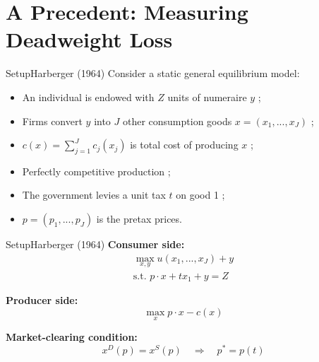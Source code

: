\documentclass{beamer}
\begin{document}
\section{A Precedent: Measuring Deadweight Loss}
\begin{frame}[shrink]
	\transfade %
	\tableofcontents[sectionstyle=show/shaded,subsectionstyle=show/shaded/hide]
	\addtocounter{framenumber}{-1}
\end{frame}
\begin{frame}{Setup}{Harberger (1964)}
	Consider a static general equilibrium model:
	\begin{itemize}
		\item An individual is endowed with $Z$ units of numeraire $y$ ;
		\item Firms convert $y$ into $J$ other consumption goods $x=(x_1,...,x_J)$ ;
		\item $c(x)=\sum_{j=1}^Jc_j(x_j)$ is total cost of producing $x$ ;
		\item Perfectly competitive production ;
		\item The government levies a unit tax $t$ on good 1 ;
		\item $p=(p_1,...,p_J)$ is the pretax prices.
	\end{itemize}
\end{frame}
\begin{frame}{Setup}{Harberger (1964)}
	\textbf{Consumer side:}
	\begin{equation}
		\begin{aligned}
			\max_{x,y} u(x_1,...,x_J)+y \\
			\mbox{s.t. } p\cdot x + tx_1 + y = Z
		\end{aligned}
	\end{equation}

	\textbf{Producer side:}
	\begin{equation}
		\max_x p\cdot x - c(x)
	\end{equation}

	\textbf{Market-clearing condition:}
	\begin{equation}
		x^D(p) = x^S(p)\quad \Rightarrow \quad p^* = p(t)
	\end{equation}
\end{frame}
\end{document}
